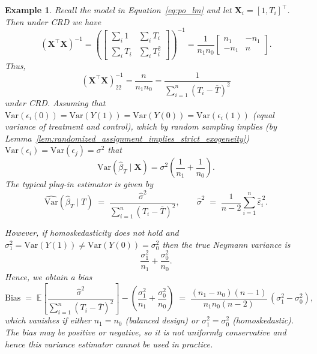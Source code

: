 \documentclass[11pt]{exam}
\theoremstyle{plain}
\newtheorem{example}{Example}
\newcommand{\E}{\mathbb{E}}
\newcommand{\bX}{\bm{X}}
\newcommand{\Var}{\mathrm{Var}}
\begin{document}
\begin{example}
  Recall the model in Equation~\eqref{eq:po_lm} and let $\bX_i = [1, T_i]^\top$.  
  Then under CRD we have
  \[
  (\bX^\top \bX)^{-1}
  = 
  \left(
  \begin{bmatrix}
  \sum_i 1 & \sum_i T_i \\[3pt]
  \sum_i T_i & \sum_i T_i^2
  \end{bmatrix}
  \right)^{-1}
  = \frac{1}{n_1 n_0}
  \begin{bmatrix}
  n_1 & -n_1 \\[3pt]
  -n_1 & n
  \end{bmatrix}.
  \]
    Thus, 
    \[
    (\bX^\top \bX)_{22}^{-1} = \frac{n}{n_1 n_0} = \frac{1}{\sum_{i=1}^n (T_i-\overline T)^2}
    \]
  under CRD.
  Assuming that $\Var(\epsilon_i(0)) =\Var(Y(1))= \Var(Y(0)) = \Var(\epsilon_i(1))$ (equal variance of treatment and control), which by random sampling implies (by Lemma~\ref{lem:randomized_assignment_implies_strict_exogeneity}) $\Var(\epsilon_i) = \Var(\epsilon_j) = \sigma^2$ that
  \[
  \Var(\hat{\beta}_T \mid \bX)
  = \sigma^2\!\left(\frac{1}{n_1} + \frac{1}{n_0}\right).
  \]
    The typical plug-in estimator is given by
    \[
    \widehat{\Var}(\hat\beta_T\mid T)
    \;=\;
    \frac{\hat\sigma^2}{\sum_{i=1}^n (T_i-\overline T)^2},
    \qquad
    \hat\sigma^2 \;=\; \frac{1}{n-2}\sum_{i=1}^n \hat\varepsilon_i^{\,2}.
    \]
  
    However, if homoskedasticity does not hold and $\sigma_1^2 = \Var(Y(1)) \neq \Var(Y(0)) = \sigma_0^2$ then the true Neymann variance is
    \[
    \frac{\sigma_1^2}{n_1} + \frac{\sigma_0^2}{n_0}.
    \] 
    Hence, we obtain a bias
    \[
    \mathrm{Bias}
    \;=\;
    \E\!\left[\frac{\hat\sigma^2}{\sum_{i=1}^n (T_i-\overline T)^2}\right]
    -
    \left(\frac{\sigma_1^2}{n_1}+\frac{\sigma_0^2}{n_0}\right)
    \;=\;
    \frac{(n_1-n_0)(n-1)}{n_1n_0(n-2)}\,(\sigma_1^2-\sigma_0^2),
    \]
    which vanishes if either $n_1=n_0$ (balanced design) or $\sigma_1^2=\sigma_0^2$ (homoskedastic). The bias may be positive or negative, so it is not uniformly conservative and hence this variance estimator cannot be used in practice.
\end{example}
\end{document}
